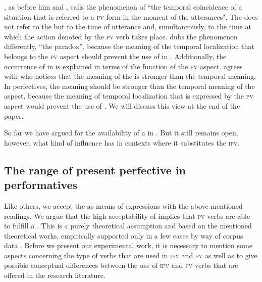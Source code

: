 \documentclass[output=paper,colorlinks,citecolor=brown,newtxmath,hidelinks]{langscibook}
\begin{document}
\citet{Dickey2000}, as before him \citet{Bondarko1971} and \citet{Galton1976}, calls the phenomenon of   “the temporal coincidence of a situation that is referred to a \textsc{pv}  form in the moment of the utterances". The   does not refer to the  but to the time of utterance and, simultaneously, to the time at which the action denoted by the \textsc{pv} verb takes place. \citet{Dewit2017} dubs the phenomenon differently, “the   paradox”, because the meaning of the temporal localization that belongs to the \textsc{pv} aspect should prevent the use of   in . Additionally, the occurrence of   in  is explained in terms of the  function of the \textsc{pv} aspect. \citet{Dewit2017} agrees with \citet{Breu2000ProblemederInteraktion} who notices that the  meaning of the   is stronger than the temporal meaning. In  perfectives, the  meaning should be stronger than the temporal meaning of the aspect, because the meaning of temporal localization that is expressed by the \textsc{pv} aspect would prevent the use of  . We will discuss this view at the end of the paper. 

So far we have argued for the availability of a   in . But it still remains open, however, what kind of influence   has in contexts where it substitutes the \textsc{ipv}. 

\subsection{The range of present perfective in performatives}\label{sub:eins:5}

Like others, we accept the   as means of expressions with the above mentioned readings. We argue that the high acceptability of   implies that \textsc{pv}  verbs are able to fulfill a . This is a purely theoretical assumption and based on the mentioned theoretical works, empirically supported only in a few cases by way of corpus data \citep{Laczinski2014,Wiemer2014}. Before we  present our experimental work, it is necessary to mention some aspects concerning the type of  verbs that are used in \textsc{ipv} and \textsc{pv} as well as to give possible conceptual differences between the use of \textsc{ipv} and \textsc{pv}  verbs that are offered in the research literature.
\end{document}
